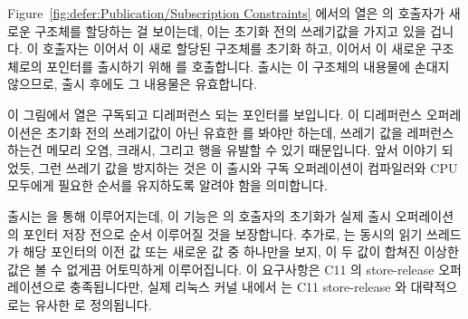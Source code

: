 Figure~\ref{fig:defer:Publication/Subscription Constraints}
에서의  열은  의 호출자가 새로운 
구조체를 할당하는 걸 보이는데, 이는 초기화 전의 쓰레기값을 가지고 있을 겁니다.
이 호출자는 이어서 이 새로 할당된 구조체를 초기화 하고, 이어서 이 새로운
 구조체로의 포인터를 출시하기 위해  를 호출합니다.
출시는 이 구조체의 내용물에 손대지 않으므로, 출시 후에도 그 내용물은
유효합니다.

이 그림에서  열은 구독되고 디레퍼런스 되는 포인터를
보입니다.
이 디레퍼런스 오퍼레이션은 초기화 전의 쓰레기값이 아닌 유효한  를
봐야만 하는데, 쓰레기 값을 레퍼런스 하는건 메모리 오염, 크래시, 그리고 행을
유발할 수 있기 때문입니다.
앞서 이야기 되었듯, 그런 쓰레기 값을 방지하는 것은 이 출시와 구독 오퍼레이션이
컴파일러와 CPU 모두에게 필요한 순서를 유지하도록 알려야 함을 의미합니다.

출시는  을 통해 이루어지는데, 이 기능은
 의 호출자의 초기화가 실제 출시 오퍼레이션의 포인터 저장 전으로
순서 이루어질 것을 보장합니다.
추가로,  는 동시의 읽기 쓰레드가 해당 포인터의 이전 값
또는 새로운 값 중 하나만을 보지, 이 두 값이 합쳐진 이상한 값은 볼 수 없게끔
어토믹하게 이루어집니다.
이 요구사항은 C11 의 store-release 오퍼레이션으로 충족됩니다만, 실제 리눅스
커널 내에서  는 C11 store-release 와 대략적으로는
유사한  로 정의됩니다.
\iffalse

